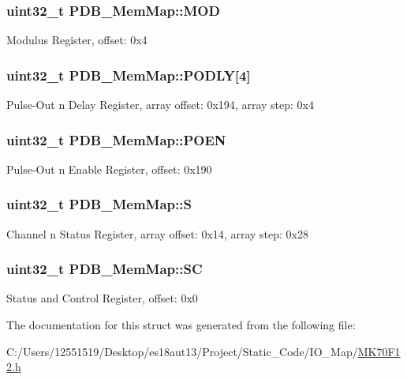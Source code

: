 \subsubsection[{M\+O\+D}]{\setlength{\rightskip}{0pt plus 5cm}uint32\+\_\+t P\+D\+B\+\_\+\+Mem\+Map\+::\+M\+O\+D}\label{struct_p_d_b___mem_map_a01bd648b1caa9b6626636fce386b496d}
Modulus Register, offset\+: 0x4 \hypertarget{struct_p_d_b___mem_map_a69081c41b606ea7a699a67e266a785d5}{}
\subsubsection[{P\+O\+D\+L\+Y}]{\setlength{\rightskip}{0pt plus 5cm}uint32\+\_\+t P\+D\+B\+\_\+\+Mem\+Map\+::\+P\+O\+D\+L\+Y\mbox{[}4\mbox{]}}\label{struct_p_d_b___mem_map_a69081c41b606ea7a699a67e266a785d5}
Pulse-\/\+Out n Delay Register, array offset\+: 0x194, array step\+: 0x4 \hypertarget{struct_p_d_b___mem_map_a259dc7b16cc8f12022cb6a5befb1660c}{}
\subsubsection[{P\+O\+E\+N}]{\setlength{\rightskip}{0pt plus 5cm}uint32\+\_\+t P\+D\+B\+\_\+\+Mem\+Map\+::\+P\+O\+E\+N}\label{struct_p_d_b___mem_map_a259dc7b16cc8f12022cb6a5befb1660c}
Pulse-\/\+Out n Enable Register, offset\+: 0x190 \hypertarget{struct_p_d_b___mem_map_afbd33089148cbb97dedff82c1c91c46d}{}
\subsubsection[{S}]{\setlength{\rightskip}{0pt plus 5cm}uint32\+\_\+t P\+D\+B\+\_\+\+Mem\+Map\+::\+S}\label{struct_p_d_b___mem_map_afbd33089148cbb97dedff82c1c91c46d}
Channel n Status Register, array offset\+: 0x14, array step\+: 0x28 \hypertarget{struct_p_d_b___mem_map_a10fb0324a394cc747b6f7d8b4c811b57}{}
\subsubsection[{S\+C}]{\setlength{\rightskip}{0pt plus 5cm}uint32\+\_\+t P\+D\+B\+\_\+\+Mem\+Map\+::\+S\+C}\label{struct_p_d_b___mem_map_a10fb0324a394cc747b6f7d8b4c811b57}
Status and Control Register, offset\+: 0x0 

The documentation for this struct was generated from the following file\+:\begin{DoxyCompactItemize}
\item 
C\+:/\+Users/12551519/\+Desktop/es18aut13/\+Project/\+Static\+\_\+\+Code/\+I\+O\+\_\+\+Map/\hyperlink{_m_k70_f12_8h}{M\+K70\+F12.\+h}\end{DoxyCompactItemize}
